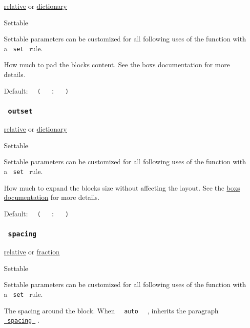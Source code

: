 \href{/docs/reference/layout/relative/}{relative} {or}
\href{/docs/reference/foundations/dictionary/}{dictionary}

{{ Settable }}

\label{parameters-inset-settable-tooltip}
Settable parameters can be customized for all following uses of the
function with a \texttt{\ set\ } rule.

How much to pad the block\textquotesingle s content. See the
\href{/docs/reference/layout/box/\#parameters-inset}{box\textquotesingle s
documentation} for more details.

Default:
\texttt{\ }{\texttt{\ (\ }}\texttt{\ }{\texttt{\ :\ }}\texttt{\ }{\texttt{\ )\ }}\texttt{\ }

\subsubsection{\texorpdfstring{\texttt{\ outset\ }}{ outset }}\label{parameters-outset}

\href{/docs/reference/layout/relative/}{relative} {or}
\href{/docs/reference/foundations/dictionary/}{dictionary}

{{ Settable }}

\label{parameters-outset-settable-tooltip}
Settable parameters can be customized for all following uses of the
function with a \texttt{\ set\ } rule.

How much to expand the block\textquotesingle s size without affecting
the layout. See the
\href{/docs/reference/layout/box/\#parameters-outset}{box\textquotesingle s
documentation} for more details.

Default:
\texttt{\ }{\texttt{\ (\ }}\texttt{\ }{\texttt{\ :\ }}\texttt{\ }{\texttt{\ )\ }}\texttt{\ }

\subsubsection{\texorpdfstring{\texttt{\ spacing\ }}{ spacing }}\label{parameters-spacing}

\href{/docs/reference/layout/relative/}{relative} {or}
\href{/docs/reference/layout/fraction/}{fraction}

{{ Settable }}

\label{parameters-spacing-settable-tooltip}
Settable parameters can be customized for all following uses of the
function with a \texttt{\ set\ } rule.

The spacing around the block. When
\texttt{\ }{\texttt{\ auto\ }}\texttt{\ } , inherits the paragraph
\href{/docs/reference/model/par/\#parameters-spacing}{\texttt{\ spacing\ }}
.

